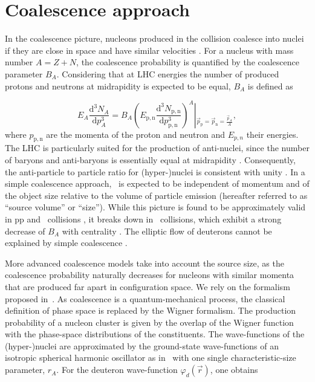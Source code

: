 \section{Coalescence approach} \label{sec:coalescence}
In the coalescence picture, nucleons produced in the collision coalesce into nuclei if they are close in space and have similar velocities \cite{Butler:1963,Kapusta:1980}. 
For a nucleus with mass number $A = Z + N$, the coalescence probability is quantified by the coalescence parameter $B_{A}$.
Considering that at LHC energies the number of produced protons and neutrons at midrapidity is expected to be equal,  $B_{A}$ is defined as

\begin{equation}
E_{A}\frac{\mathrm{d}^{3}N_{A}}{\mathrm{d}p_{A}^{3}}=B_{A}{\left(E_{\mathrm{p,n}}\frac{\mathrm{d}^{3}N_{\mathrm{p,n}}}{\mathrm{d}p_{\mathrm{p,n}}^{3}}\right)^{A}}\left\vert_{\vec{p}_{\mathrm{p}}=\vec{p}_{\mathrm{n}}=\frac{\vec{p}_{A}}{A}} \right.,
\label{eq:BA}
\end{equation}
%
where $p_{\mathrm{p,n}}$ are the momenta of the proton and neutron and $E_{p,n}$ their energies.
%
The LHC is particularly suited for the production of anti-nuclei, since the number of baryons and anti-baryons is essentially equal at midrapidity \cite{Abbas:2013rua}. Consequently, the anti-particle to particle ratio for (hyper-)nuclei is consistent with unity \cite{ALICE:nucleipp2017, anielski-HQ14, Acharya:2017dmc, Adam:2015yta}.
In a simple coalescence approach, \bA~is expected to be independent of momentum and of the object size relative to the volume of particle emission (hereafter referred to as ``source volume'' or ``size'').
While this picture is found to be approximately valid in pp and \pPb~collisions \cite{ALICE:nucleipp2017, anielski-HQ14}, it breaks down in \PbPb~collisions, which exhibit a strong decrease of $B_{A}$ with centrality \cite{ALICE:deuteronppPbPb2015}. 
The elliptic flow of deuterons cannot be explained by simple coalescence \cite{Acharya:2017dmc}. 

More advanced coalescence models \cite{Sato:1981ez, Nagle:1996vp, Scheibl:1998tk} take into account the source size, as the coalescence probability naturally decreases for nucleons with similar momenta that are produced far apart in configuration space. We rely on the formalism proposed in~\cite{Scheibl:1998tk}.
As coalescence is a quantum-mechanical process, the classical definition of phase space is replaced by the Wigner formalism. The production probability of a nucleon cluster is given by the overlap of the Wigner function with the phase-space distributions of the constituents.
The wave-functions of the (hyper-)nuclei are approximated by the ground-state wave-functions of an isotropic spherical harmonic oscillator as in~\cite{Scheibl:1998tk} with one single characteristic-size parameter, $r_{A}$. 
For the deuteron wave-function $\varphi_{d}(\vec{r}) $, one obtains

